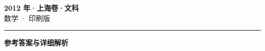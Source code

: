 \documentclass[zihao=5, a4paper]{ctexart}
\begin{document}
\begin{center}
  {\Large\bfseries 2012 年·上海卷·文科}\\[4pt]
  {\large 数学 · 印刷版}
\end{center}
\medskip
{}

\par\bigskip\hrule\bigskip
{}
\begin{center}{\large\bfseries 参考答案与详细解析}\end{center}
\smallskip

\end{document}
